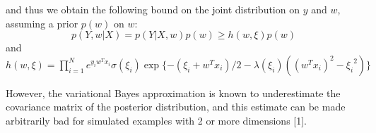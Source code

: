 and thus we obtain the following bound on the joint distribution on $y$ and $w$, assuming a prior $p(w)$ on $w$:
\begin{equation}
p( Y , w | X)=p( Y | X, w)p(w) \geq h(w, \xi)p(w)
\end{equation}
and $h(w,\xi) = \prod_{i=1}^{N} e^{y_iw^T x_i} \sigma(\xi_i)\exp\{-(\xi_i+w^T x_i)/2-\lambda(\xi_i)((w^T x_i)^2-{\xi_i}^2)\}$


However, the variational Bayes approximation is known to underestimate the covariance matrix of the posterior distribution, and this estimate can be made arbitrarily bad for simulated examples with 2 or more dimensions [1].


